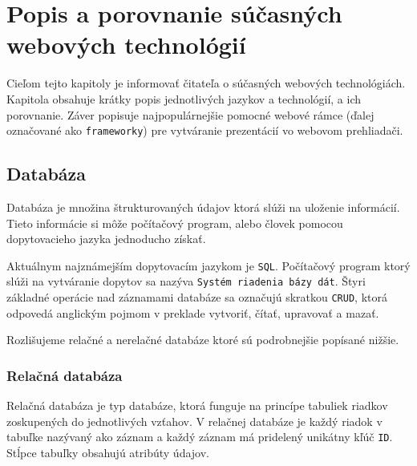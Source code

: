 \chapter{Popis a porovnanie súčasných webových technológií}
\label{kapitola2}
Cieľom tejto kapitoly je informovať čitateľa o súčasných webových technológiách. Kapitola obsahuje krátky popis jednotlivých jazykov a technológií, a ich porovnanie. Záver popisuje najpopulárnejšie pomocné webové rámce (ďalej označované ako \texttt{frameworky}) pre vytváranie prezentácií vo webovom prehliadači.

\section{Databáza}
Databáza\cite{database} je množina štrukturovaných údajov ktorá slúži na uloženie informácií. Tieto informácie si môže počítačový program, alebo človek pomocou dopytovacieho jazyka jednoducho získať. 

Aktuálnym najznámejším dopytovacím jazykom je \texttt{SQL}. Počítačový program ktorý slúži na vytváranie dopytov sa nazýva \texttt{Systém riadenia bázy dát}. Štyri základné operácie nad záznamami databáze sa označujú skratkou \texttt{CRUD}, ktorá odpovedá anglickým pojmom v preklade vytvoriť, čítať, upravovať a mazať. 

Rozlišujeme relačné a nerelačné databáze ktoré sú podrobnejšie popísané nižšie.

\subsection{Relačná databáza}
Relačná databáza je typ databáze, ktorá funguje na princípe tabuliek riadkov zoskupených do jednotlivých vzťahov. V relačnej databáze je každý riadok v tabuľke nazývaný ako záznam a každý záznam má pridelený unikátny kľúč \texttt{ID}. Stĺpce tabuľky obsahujú atribúty údajov.

